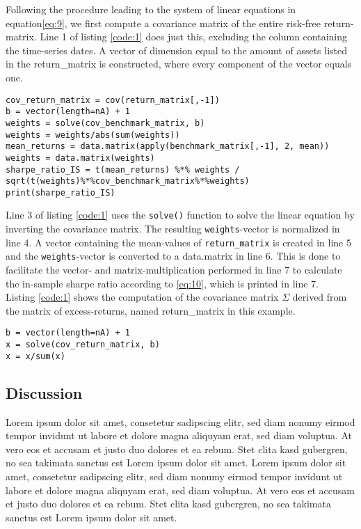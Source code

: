 Following the procedure leading to the system of linear equations in equation\ref{eq:9}, we first compute a covariance matrix of the entire risk-free return-matrix. Line 1 of listing \ref{code:1} does just this, excluding the column containing the time-series dates. A vector of dimension equal to the amount of assets listed in the return\_matrix is constructed, where every component of the vector equals one.\\

\begin{lstlisting}[caption={This example shows how the covariance-matrix of a returns-matrix is computed in R.}, label=code:1, frame=single]
cov_return_matrix = cov(return_matrix[,-1])
b = vector(length=nA) + 1
weights = solve(cov_benchmark_matrix, b)
weights = weights/abs(sum(weights))
mean_returns = data.matrix(apply(benchmark_matrix[,-1], 2, mean))
weights = data.matrix(weights)
sharpe_ratio_IS = t(mean_returns) %*% weights / sqrt(t(weights)%*%cov_benchmark_matrix%*%weights)
print(sharpe_ratio_IS)
\end{lstlisting}

Line 3 of listing \ref{code:1} uses the \lstinline|solve()| function to solve the linear equation by inverting the covariance matrix. The resulting \lstinline|weights|-vector is normalized in line 4. A vector containing the mean-values of \lstinline|return_matrix| is created in line 5 and the \lstinline|weights|-vector is converted to a data.matrix in line 6. This is done to facilitate the vector- and matrix-multiplication performed in line 7 to calculate the in-sample sharpe ratio according to \ref{eq:10}, which is printed in line 7.\\

Listing \ref{code:1} shows the computation of the covariance matrix $\Sigma$ derived from the matrix of excess-returns, named return\_matrix in this example. 

\begin{lstlisting}[caption={Code example shows how to solve a system of linear equations}, label=code:2, frame=single] 
b = vector(length=nA) + 1
x = solve(cov_return_matrix, b)
x = x/sum(x)
\end{lstlisting}

\subsection{Discussion}
Lorem ipsum dolor sit amet, consetetur sadipscing elitr, sed diam nonumy eirmod tempor invidunt ut labore et dolore magna aliquyam erat, sed diam voluptua. At vero eos et accusam et justo duo dolores et ea rebum. Stet clita kasd gubergren, no sea takimata sanctus est Lorem ipsum dolor sit amet. Lorem ipsum dolor sit amet, consetetur sadipscing elitr, sed diam nonumy eirmod tempor invidunt ut labore et dolore magna aliquyam erat, sed diam voluptua. At vero eos et accusam et justo duo dolores et ea rebum. Stet clita kasd gubergren, no sea takimata sanctus est Lorem ipsum dolor sit amet.


